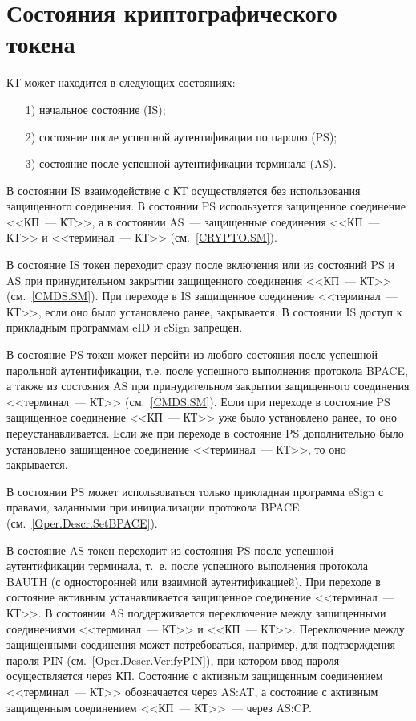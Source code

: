 \chapter{Состояния криптографического токена}\label{STATES}

КТ может находится в следующих состояниях:
%
\begin{itemize}
\item[1)]
начальное состояние (IS);
\item[2)]
состояние после успешной аутентификации по паролю (PS);
\item[3)]
состояние после успешной аутентификации терминала (AS).
\end{itemize}

В состоянии IS взаимодействие с КТ осуществляется без использования 
защищенного соединения. В состоянии PS используется 
защищенное соединение <<КП~--- КТ>>, 
а в состоянии AS~--- защищенные соединения <<КП~--- КТ>> 
и <<терминал~--- КТ>> (см.~\ref{CRYPTO.SM}).

В состояние IS токен переходит сразу после включения 
или из состояний PS и AS при принудительном закрытии защищенного соединения 
<<КП~--- КТ>> (см.~\ref{CMDS.SM}). 
%
При переходе в IS защищенное соединение <<терминал~--- КТ>>, 
если оно было установлено ранее, закрывается.
В состоянии IS доступ к прикладным программам eID и eSign запрещен.

В состояние PS токен может перейти из любого состояния 
после успешной парольной аутентификации, 
т.е. после успешного выполнения протокола BPACE,
а также из состояния AS при принудительном закрытии 
защищенного соединения <<терминал~--- КТ>> (см.~\ref{CMDS.SM}).
Если при переходе в состояние PS защищенное соединение <<КП~--- КТ>> 
уже было установлено ранее, то оно переустанавливается. 
Если же при переходе в состояние PS дополнительно было установлено 
защищенное соединение <<терминал~--- КТ>>, то оно закрывается.

В состоянии PS может использоваться только прикладная программа eSign
с правами, заданными при инициализации протокола BPACE 
(см.~\ref{Oper.Descr.SetBPACE}).

В состояние AS токен переходит из состояния PS 
после успешной аутентификации терминала, т.~е. 
после успешного выполнения протокола BAUTH 
(с односторонней или взаимной аутентификацией).
%
При переходе в состояние активным устанавливается 
защищенное соединение <<терминал~--- КТ>>.
В состоянии AS поддерживается переключение  
между защищенными соединениями <<терминал~--- КТ>> и <<КП~--- КТ>>.
Переключение между защищенными соединения может потребоваться, 
например, для подтверждения пароля PIN (см.~\ref{Oper.Descr.VerifyPIN}), 
при котором ввод пароля осуществляется через КП. 
Состояние с активным защищенным соединением <<терминал~--- КТ>>
обозначается через AS:AT, 
а состояние с активным защищенным соединением <<КП~--- КТ>>~--- 
через AS:CP. 

